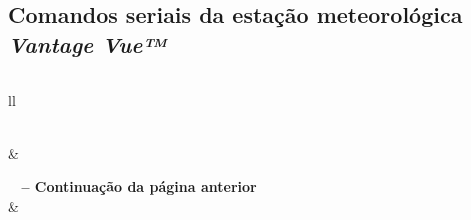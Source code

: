 \begin{anexosenv}
    \chapter{Comandos seriais da estação meteorológica \textit{Vantage Vue™}} \label{anex:anexo1}

    \inputminted[bgcolor=bg, 
    tabsize=4, baselinestretch=1, breaklines]{python}{codes/time-query-calculation-4-tom.py}
    
    \begin{center}
        \begin{longtable}{ll}
        \caption{Comandos seriais suportados pela estação meteorológica \textit{Vantage Vue™}}\\
        \hline
         &  \\ \hline
        \endfirsthead

        {{\bfseries \tablename\ \thetable{} -- Continuação da página anterior}} \\

        \hline
         &  \\ \hline
        \endhead

         \\
        \endfoot

        \endlastfoot


\end{longtable}
\end{center}
\end{anexosenv}
